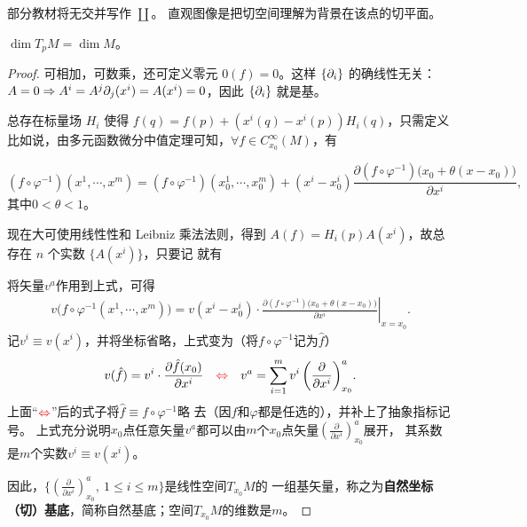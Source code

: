 \begin{remark}
    部分教材将无交并写作 $\coprod$。
    直观图像是把切空间理解为背景在该点的切平面。
\end{remark}

\begin{theorem}
    $\dim T_p M=\dim M$。
\end{theorem}

\begin{proof}
    可相加，可数乘，还可定义零元 $0(f)=0$。这样 $\{\partial_i\}$ 的确线性无关：$A=0\Rightarrow A^i=A^j\partial_j(x^i)=A(x^i)=0$，因此 $\{\partial_i\}$ 就是基。


    总存在标量场 $H_i$ 使得 $f(q) =f(p)+(x^i(q)-x^i(p))H_i(q)$，只需定义
比如说，由多元函数微分中值定理可知，$\forall f\in C_{x_0}^\infty(M)$，有

\begin{equation*} %
    (f \circ\varphi^{-1})(x^1,\cdots,x^m)=(f \circ\varphi^{-1})(x^1_0,\cdots,x^m_0)+ 
    (x^i-x^i_0) \frac{\partial (f \circ\varphi^{-1}) \bigl(x_0+\theta(x-x_0) \bigr)}{\partial x^i},
\end{equation*}
其中$0<\theta<1$。

现在大可使用线性性和 Leibniz 乘法法则，得到 $A(f)=H_i(p) A(x^i)$，故总存在 $n$ 个实数 $\{A(x^i)\}$，只要记
就有

将矢量$v^a$作用到上式，可得
\begin{align*} %
    v\bigl( f \circ\varphi^{-1} (x^1,\cdots,x^m)\bigr) = v(x^i-x^i_0) \cdot      \left.
     \frac{\partial (f \circ\varphi^{-1}) \bigl(x_0+\theta(x-x_0) \bigr)}{\partial x^i}\right|_{x=x_0}.
\end{align*}
记$v^i\equiv v(x^i)$，并将坐标省略，上式变为（将$f \circ\varphi^{-1}$记为$\hat{f}$）
\begin{equation}\label{chdm:eqn_v-expand-on-natural-bases}
    v( \hat{f} ) = v^i \cdot 
    \frac{\partial \hat{f} (x_0)}{\partial x^i}
    {\quad \color{red}\Leftrightarrow \quad }
    v^a = \sum_{i=1}^{m} { v^i \left(\frac{\partial }{\partial x^i}\right)^a_{x_0} }.
\end{equation}
上面“${ \color{red}\Leftrightarrow }$”后的式子将$\hat{f}\equiv f \circ\varphi^{-1} $略
去（因$f$和$\varphi$都是任选的），并补上了抽象指标记号。
上式充分说明$x_0$点任意矢量$v^a$都可以由$m$个$x_0$点矢量$(\frac{\partial }{\partial x^i})^a_{x_0} $展开，
其系数是$m$个实数$v^i\equiv v(x^i)$。

因此，$\{(\frac{\partial }{\partial x^i})^a_{x_0}, \ 1\leqslant i\leqslant m\}$是线性空间$T_{x_0}M$的
一组基矢量，称之为\textbf{自然坐标（切）基底}，简称自然基底；空间$T_{x_0}M$的维数是$m$。
\end{proof}



